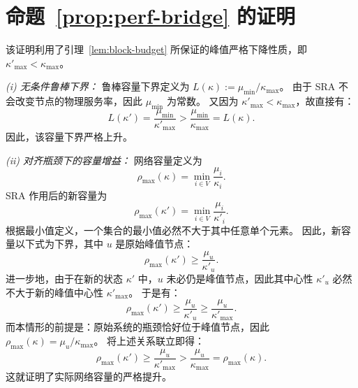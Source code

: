 \documentclass[journal]{IEEEtran}
\theoremstyle{plain}
\theoremstyle{definition}
\begin{document}
\section{命题~\ref{prop:perf-bridge} 的证明}
\label{app:proof_prop_perf_bridge}
\begin{IEEEproof}
该证明利用了引理~\ref{lem:block-budget} 所保证的峰值严格下降性质，即
$\kappa'_{\max} < \kappa_{\max}$。

\noindent\textit{(i) 无条件鲁棒下界：}
鲁棒容量下界定义为
$L(\kappa) := \mu_{\min}/\kappa_{\max}$。
由于 SRA 不会改变节点的物理服务率，因此 $\mu_{\min}$ 为常数。
又因为 $\kappa'_{\max} < \kappa_{\max}$，故直接有：
\begin{equation}
L(\kappa') = \frac{\mu_{\min}}{\kappa'_{\max}} > \frac{\mu_{\min}}{\kappa_{\max}} = L(\kappa).
\end{equation}
因此，该容量下界严格上升。

\noindent\textit{(ii) 对齐瓶颈下的容量增益：}
网络容量定义为
\begin{equation}
\rho_{\max}(\kappa) = \min_{i \in V} \frac{\mu_i}{\kappa_i}.
\end{equation}
SRA 作用后的新容量为
\begin{equation}
\rho_{\max}(\kappa') = \min_{i \in V} \frac{\mu_i}{\kappa'_i}.
\end{equation}
根据最小值定义，一个集合的最小值必然不大于其中任意单个元素。
因此，新容量以下式为下界，其中 $u$ 是原始峰值节点：
\begin{equation}
\rho_{\max}(\kappa') \ge \frac{\mu_u}{\kappa'_u}.
\end{equation}
进一步地，由于在新的状态 $\kappa'$ 中，$u$ 未必仍是峰值节点，因此其中心性 $\kappa'_u$ 必然不大于新的峰值中心性 $\kappa'_{\max}$。
于是有：
\begin{equation}
\rho_{\max}(\kappa') \ge \frac{\mu_u}{\kappa'_u} \ge \frac{\mu_u}{\kappa'_{\max}}.
\end{equation}
而本情形的前提是：原始系统的瓶颈恰好位于峰值节点，因此
$\rho_{\max}(\kappa) = \mu_u/\kappa_{\max}$。
将上述关系联立即得：
\begin{equation}
\rho_{\max}(\kappa') \ge \frac{\mu_u}{\kappa'_{\max}} > \frac{\mu_u}{\kappa_{\max}} = \rho_{\max}(\kappa).
\end{equation}
这就证明了实际网络容量的严格提升。
\end{IEEEproof}
\end{document}
